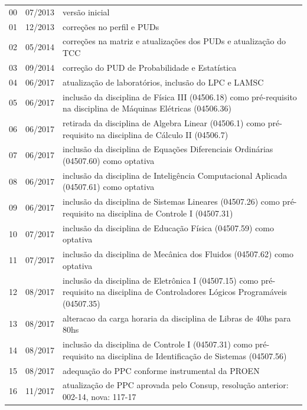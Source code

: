 \begin{center}
\begin{longtable}{lp{2cm}p{11cm}}
		
		00 & 07/2013 & versão inicial\\
		01 & 12/2013 & correções no perfil e PUDs\\
		02 & 05/2014 & correções na matriz e atualizações dos PUDs e atualização do TCC\\
		03 & 09/2014 & correção do PUD de Probabilidade e Estatística\\
		04 & 06/2017 & atualização de laboratórios, inclusão do LPC e LAMSC\\
		05 & 06/2017 & inclusão da disciplina de Física III (04506.18) como pré-requisito na disciplina de Máquinas Elétricas (04506.36)\\
		06 & 06/2017 & retirada da disciplina de Algebra Linear (04506.1) como pré-requisito na disciplina de Cálculo II (04506.7)\\
		07 & 06/2017 & inclusão da disciplina de Equações Diferenciais Ordinárias (04507.60) como optativa\\
		08 & 06/2017 & inclusão da disciplina de Inteligência Computacional Aplicada (04507.61) como optativa\\
		09 & 06/2017 & inclusão da disciplina de Sistemas Lineares (04507.26) como pré-requisito na disciplina de Controle I (04507.31)\\
		10 & 07/2017 & inclusão da disciplina de Educação Física (04507.59) como optativa\\
		11 & 07/2017 & inclusão da disciplina de Mecânica dos Fluidos (04507.62) como optativa\\
		12 & 08/2017 & inclusão da disciplina de Eletrônica I (04507.15) como pré-requisito na disciplina de Controladores Lógicos Programáveis (04507.35)\\
		13 & 08/2017 & alteracao da carga horaria da disciplina de Libras de 40hs para 80hs\\
		14 & 08/2017 & inclusão da disciplina de Controle I (04507.31) como pré-requisito na disciplina de Identificação de Sistemas (04507.56)\\
		15 & 08/2017 & adequação do PPC conforme instrumental da PROEN\\
		16 & 11/2017 & atualização de PPC aprovada pelo Consup, resolução anterior: 002-14, nova: 117-17\\

\end{longtable}
\end{center}
